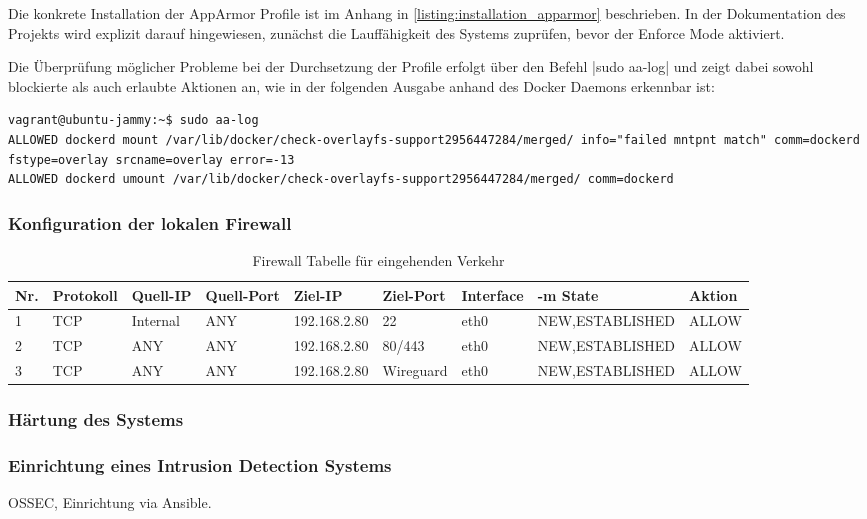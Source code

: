 Die konkrete Installation der AppArmor Profile ist im Anhang in \autoref{listing:installation_apparmor} beschrieben. In der Dokumentation des Projekts wird explizit darauf hingewiesen, zunächst die Lauffähigkeit des Systems zuprüfen, bevor der Enforce Mode aktiviert.

Die Überprüfung möglicher Probleme bei der Durchsetzung der Profile erfolgt über den Befehl |sudo aa-log|
und zeigt dabei sowohl blockierte als auch erlaubte Aktionen an, wie in der folgenden Ausgabe anhand des Docker Daemons erkennbar ist:

\begin{verbatim}
vagrant@ubuntu-jammy:~$ sudo aa-log 
ALLOWED dockerd mount /var/lib/docker/check-overlayfs-support2956447284/merged/ info="failed mntpnt match" comm=dockerd fstype=overlay srcname=overlay error=-13
ALLOWED dockerd umount /var/lib/docker/check-overlayfs-support2956447284/merged/ comm=dockerd
\end{verbatim}

\subsubsection{Konfiguration der lokalen Firewall}


\begin{table}[!ht]
    \centering
    \begin{adjustbox}{width=\textwidth}

    \begin{tabular}{|l|l|l|l|l|l|l|l|l|}
        \hline
            Nr. & Protokoll & Quell-IP & Quell-Port & Ziel-IP & Ziel-Port & Interface & -m State & Aktion \\ \hline
            1 & TCP & Internal & ANY & 192.168.2.80 & 22 & eth0 & NEW,ESTABLISHED & ALLOW \\ \hline
            2 & TCP & ANY & ANY & 192.168.2.80 & 80/443 & eth0 & NEW,ESTABLISHED & ALLOW \\ \hline
            3 & TCP & ANY & ANY & 192.168.2.80 & Wireguard & eth0 & NEW,ESTABLISHED & ALLOW \\ \hline
        \end{tabular}
    \end{adjustbox}
    \caption{Firewall Tabelle für eingehenden Verkehr}
    \label{regeln_fw_incoming}
\end{table}

\subsubsection{Härtung des Systems}


\subsubsection{Einrichtung eines Intrusion Detection Systems}

OSSEC, Einrichtung via Ansible.



